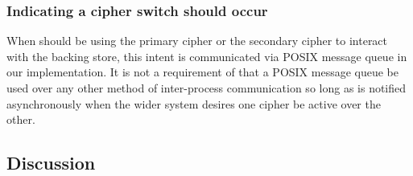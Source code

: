 \subsubsection{Indicating a cipher switch should occur}

When \SYSTEM{} should be using the primary cipher or the secondary cipher to
interact with the backing store, this intent is communicated via POSIX message
queue in our implementation. It is not a requirement of \SYSTEM{} that a POSIX
message queue be used over any other method of inter-process communication so
long as \SYSTEM{} is notified asynchronously when the wider system desires one
cipher be active over the other.

\subsection{Discussion}



